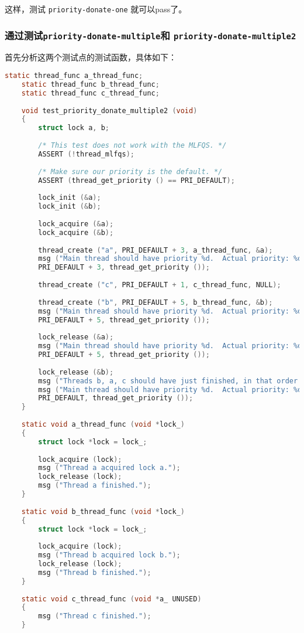 \documentclass{article}
\begin{document}
	这样，测试 \texttt{priority-donate-one} 就可以pass了。
	
	\subsubsection{通过测试\texttt{priority-donate-multiple}和 \texttt{priority-donate-multiple2}}
	
	首先分析这两个测试点的测试函数，具体如下：
	
	\begin{lstlisting}[language=C, title=\texttt{priority-donate-multiple()}测试]
    static thread_func a_thread_func;
    static thread_func b_thread_func;
    static thread_func c_thread_func;
    
    void test_priority_donate_multiple2 (void) 
    {
    	struct lock a, b;
    	
    	/* This test does not work with the MLFQS. */
    	ASSERT (!thread_mlfqs);
    	
    	/* Make sure our priority is the default. */
    	ASSERT (thread_get_priority () == PRI_DEFAULT);
    	
    	lock_init (&a);
    	lock_init (&b);
    	
    	lock_acquire (&a);
    	lock_acquire (&b);
    	
    	thread_create ("a", PRI_DEFAULT + 3, a_thread_func, &a);
    	msg ("Main thread should have priority %d.  Actual priority: %d.",
    	PRI_DEFAULT + 3, thread_get_priority ());
    	
    	thread_create ("c", PRI_DEFAULT + 1, c_thread_func, NULL);
    	
    	thread_create ("b", PRI_DEFAULT + 5, b_thread_func, &b);
    	msg ("Main thread should have priority %d.  Actual priority: %d.",
    	PRI_DEFAULT + 5, thread_get_priority ());
    	
    	lock_release (&a);
    	msg ("Main thread should have priority %d.  Actual priority: %d.",
    	PRI_DEFAULT + 5, thread_get_priority ());
    	
    	lock_release (&b);
    	msg ("Threads b, a, c should have just finished, in that order.");
    	msg ("Main thread should have priority %d.  Actual priority: %d.",
    	PRI_DEFAULT, thread_get_priority ());
    }
    
    static void a_thread_func (void *lock_) 
    {
    	struct lock *lock = lock_;
    	
    	lock_acquire (lock);
    	msg ("Thread a acquired lock a.");
    	lock_release (lock);
    	msg ("Thread a finished.");
    }
    
    static void b_thread_func (void *lock_) 
    {
    	struct lock *lock = lock_;
    	
    	lock_acquire (lock);
    	msg ("Thread b acquired lock b.");
    	lock_release (lock);
    	msg ("Thread b finished.");
    }
    
    static void c_thread_func (void *a_ UNUSED) 
    {
    	msg ("Thread c finished.");
    }
	\end{lstlisting}
	
\end{document}

